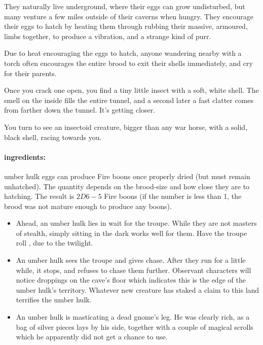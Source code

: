 \begin{multicols}{2}
They naturally live underground, where their eggs can grow undisturbed, but many venture a few miles outside of their caverns when hungry.
They encourage their eggs to hatch by heating them through rubbing their massive, armoured, limbs together, to produce a vibration, and a strange kind of purr.

Due to heat encouraging the eggs to hatch, anyone wandering nearby with a torch often encourages the entire brood to exit their shells immediately, and cry for their parents.

\begin{boxtext}

  Once you crack one open, you find a tiny little insect with a soft, white shell.
  The smell on the inside fills the entire tunnel, and a second later a fast clatter comes from farther down the tunnel.
  It's getting closer.

  You turn to see an insectoid creature, bigger than any war horse, with a solid, black shell, racing towards you.

\end{boxtext}

\paragraph{\Glspl{ingredient}:}
umber hulk eggs can produce Fire \glspl{boon} once properly dried (but must remain unhatched).
The quantity depends on the brood-size and how close they are to hatching.
The result is $2D6-5$ Fire \glspl{boon} (if the number is less than 1, the brood was not mature enough to produce any \glspl{boon}).

\showEnc

\begin{itemize}
  \item
  Ahead, an umber hulk lies in wait for the troupe.
  While they are not masters of stealth, simply sitting in the dark works well for them.
  Have the troupe roll , \tn[9] due to the twilight.
  \item
  An umber hulk sees the troupe and gives chase.
  After they run for a little while, it stops, and refuses to chase them further.
  Observant characters will notice droppings on the cave's floor which indicates this is the edge of the umber hulk's territory.
  Whatever new creature has staked a claim to this land terrifies the umber hulk.
  \item
  An umber hulk is masticating a dead gnome's leg.
  He was clearly rich, as a bag of silver pieces lays by his side, together with a couple of magical scrolls which he apparently did not get a chance to use.
\end{itemize}


\end{multicols}
